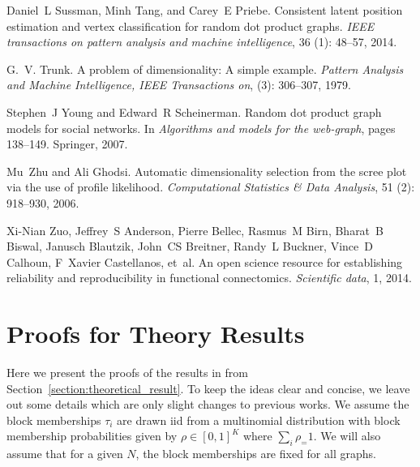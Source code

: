 \documentclass[10pt,letterpaper]{article}
\begin{document}
\begin{thebibliography}{10}
Daniel~L Sussman, Minh Tang, and Carey~E Priebe.
\newblock Consistent latent position estimation and vertex classification for
  random dot product graphs.
\newblock \emph{IEEE transactions on pattern analysis and machine
  intelligence}, 36 (1): 48--57, 2014.

G.~V. Trunk.
\newblock A problem of dimensionality: A simple example.
\newblock \emph{Pattern Analysis and Machine Intelligence, IEEE Transactions
  on},  (3): 306--307, 1979.


Stephen~J Young and Edward~R Scheinerman.
\newblock Random dot product graph models for social networks.
\newblock In \emph{Algorithms and models for the web-graph}, pages 138--149.
  Springer, 2007.

Mu~Zhu and Ali Ghodsi.
\newblock Automatic dimensionality selection from the scree plot via the use of
  profile likelihood.
\newblock \emph{Computational Statistics \& Data Analysis}, 51
  (2): 918--930, 2006.

Xi-Nian Zuo, Jeffrey~S Anderson, Pierre Bellec, Rasmus~M Birn, Bharat~B Biswal,
  Janusch Blautzik, John~CS Breitner, Randy~L Buckner, Vince~D Calhoun,
  F~Xavier Castellanos, et~al.
\newblock An open science resource for establishing reliability and
  reproducibility in functional connectomics.
\newblock \emph{Scientific data}, 1, 2014.

\end{thebibliography}

\appendix

\section{Proofs for Theory Results}
Here we present the proofs of the results in from Section~\ref{section:theoretical_result}. To keep the ideas clear and concise, we leave out some details which are only slight changes to previous works.
We assume the block memberships $\tau_i$ are drawn iid from a multinomial distribution with block membership probabilities given by $\rho\in[0,1]^K$ where $\sum_i \rho_=1$.
We will also assume that for a given $N$, the block memberships are fixed for all graphs.
\end{document}

